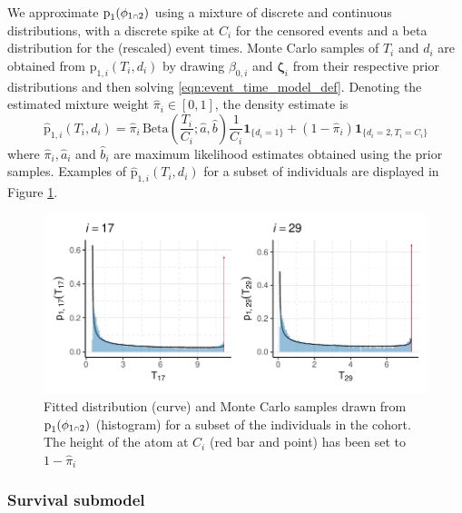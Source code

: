 \documentclass[
  10pt,
  a4paper,
]{article}
\let\Oldcap\cap
\renewcommand{\cap}{\mathrel{\mathsmaller{\Oldcap}}}
\newcommand{\pd}{\text{p}}
\begin{document}
We approximate \(\pd_{1}(\phi_{1 \cap 2})\) using a mixture of discrete
and continuous distributions, with a discrete spike at \(C_{i}\) for the
censored events and a beta distribution for the (rescaled) event times.
Monte Carlo samples of \(T_{i}\) and \(d_{i}\) are obtained from
\(\pd_{1, i}(T_{i}, d_{i})\) by drawing \(\beta_{0, i}\) and
\(\boldsymbol{\zeta}_{i}\) from their respective prior distributions and
then solving \eqref{eqn:event_time_model_def}. Denoting the estimated
mixture weight \(\widehat{\pi}_{i} \in [0, 1]\), the density estimate is
\begin{equation}
  \widehat{\pd}_{1, i}(T_{i}, d_{i}) =
    \widehat{\pi}_{i} \, \text{Beta}\left(\frac{T_{i}}{C_{i}}; \widehat{a}, \widehat{b}\right) \frac{1}{C_{i}} \boldsymbol{1}_{\{d_{i} = 1\}} +
    (1 - \widehat{\pi}_{i}) \boldsymbol{1}_{\{d_{i} = 2, T_{i} = C_{i}\}}
  \label{eqn:pf-event-time-prior-dist}
\end{equation} where \(\widehat{\pi}_{i}, \widehat{a}_{i}\) and
\(\widehat{b}_{i}\) are maximum likelihood estimates obtained using the
prior samples. Examples of \(\widehat{\pd}_{1, i}(T_{i}, d_{i})\) for a
subset of individuals are displayed in Figure \ref{fig:pf_prior_fit}.

\begin{figure}

{\centering \includegraphics{../plots/mimic-example/pf-prior-plot-small} 

}

\caption{Fitted distribution (curve) and Monte Carlo samples drawn from $\pd_{1}(\phi_{1 \cap 2})$ (histogram) for a subset of the individuals in the cohort. The height of the atom at $C_{i}$ (red bar and point) has been set to $1 - \widehat{\pi}_{i}$}\label{fig:pf_prior_fit}
\end{figure}

\hypertarget{survival-submodel}{%
\subsubsection{Survival submodel}\label{survival-submodel}}
\end{document}
